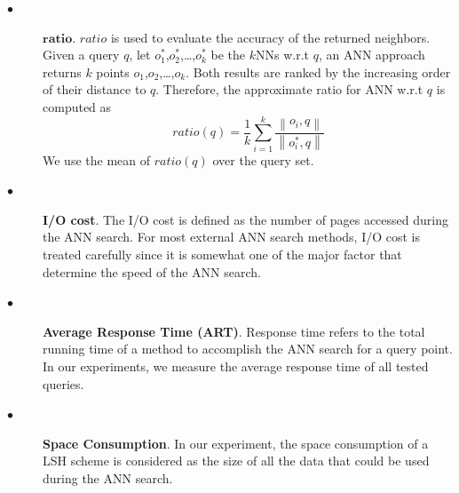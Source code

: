 \documentclass[twocolumn]{svjour3}          %
\begin{document}
\begin{description}
\item[$\bullet$] $\textbf{ratio}$.
$ratio$ is used to evaluate the accuracy of the returned neighbors. Given a query $q$, let $o_1^*$,$o_2^*$,\ldots,$o_k^*$ be the $k$NNs w.r.t $q$, an ANN approach returns $k$ points $o_1$,$o_2$,\ldots,$o_k$. Both results are ranked by the increasing order of their distance to $q$. Therefore, the approximate ratio for ANN w.r.t $q$ is computed as
\begin{equation}
ratio(q) = \frac{1}{k}\sum_{i=1}^{k}\frac{\left\|{ o_i,q }\right\|}{\left\|{ o_i^*,q }\right\|}
\label{Eq:ratio}
\end{equation}
We use the mean of $ratio(q)$ over the query set.
\item [$\bullet$] \textbf{I/O cost}. The I/O cost is defined as the number of pages accessed during the ANN search. For most external ANN search methods, I/O cost is treated carefully since it is somewhat one of the major factor that determine the speed of the ANN search.
\item [$\bullet$] \textbf{Average Response Time (ART)}. Response time refers to the total running time of a method to accomplish the ANN search for a query point. In our experiments, we measure the average response time of all tested queries.
\item [$\bullet$] \textbf{Space Consumption}. In our experiment, the space consumption of a LSH scheme is considered as the size of all the data that could be used during the ANN search.
\end{description}
\end{document}
